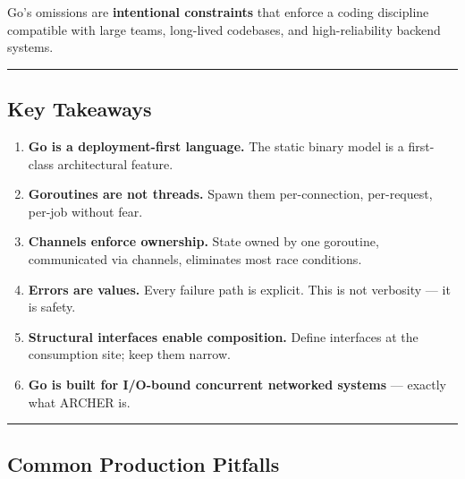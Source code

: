 \documentclass[11pt,openany]{book}
\providecommand{\tightlist}{%
  \setlength{\itemsep}{0pt}\setlength{\parskip}{0pt}}
\begin{document}
Go's omissions are \textbf{intentional constraints} that enforce a
coding discipline compatible with large teams, long-lived codebases, and
high-reliability backend systems.

\begin{center}\rule{0.5\linewidth}{0.5pt}\end{center}

\hypertarget{key-takeaways}{%
\subsection{Key Takeaways}\label{key-takeaways}}

\begin{enumerate}
\def\labelenumi{\arabic{enumi}.}
\tightlist
\item
  \textbf{Go is a deployment-first language.} The static binary model is
  a first-class architectural feature.
\item
  \textbf{Goroutines are not threads.} Spawn them per-connection,
  per-request, per-job without fear.
\item
  \textbf{Channels enforce ownership.} State owned by one goroutine,
  communicated via channels, eliminates most race conditions.
\item
  \textbf{Errors are values.} Every failure path is explicit. This is
  not verbosity --- it is safety.
\item
  \textbf{Structural interfaces enable composition.} Define interfaces
  at the consumption site; keep them narrow.
\item
  \textbf{Go is built for I/O-bound concurrent networked systems} ---
  exactly what ARCHER is.
\end{enumerate}

\begin{center}\rule{0.5\linewidth}{0.5pt}\end{center}

\hypertarget{common-production-pitfalls}{%
\subsection{Common Production
Pitfalls}\label{common-production-pitfalls}}
\end{document}
